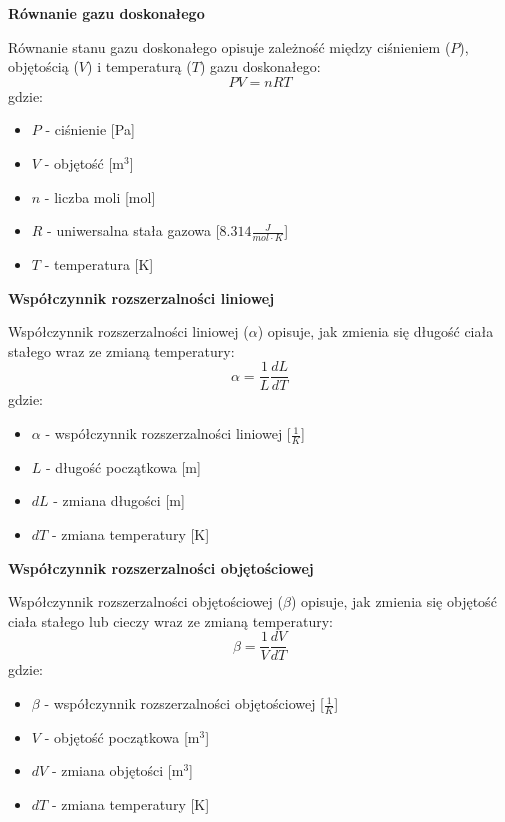 \documentclass{article}
\begin{document}
\textbf{Równanie gazu doskonałego} 

Równanie stanu gazu doskonałego opisuje zależność między ciśnieniem ($P$), objętością ($V$) i temperaturą ($T$) gazu doskonałego:
\begin{equation}
    PV = nRT
\end{equation}
gdzie:
\begin{itemize}
    \item $P$ - ciśnienie [Pa]
    \item $V$ - objętość [m$^3$]
    \item $n$ - liczba moli [mol]
    \item $R$ - uniwersalna stała gazowa [$8.314 \frac{J}{mol \cdot K}$]
    \item $T$ - temperatura [K]
\end{itemize}

\textbf{Współczynnik rozszerzalności liniowej} 

Współczynnik rozszerzalności liniowej ($\alpha$) opisuje, jak zmienia się długość ciała stałego wraz ze zmianą temperatury:
\begin{equation}
    \alpha = \frac{1}{L} \frac{dL}{dT}
\end{equation}
gdzie:
\begin{itemize}
    \item $\alpha$ - współczynnik rozszerzalności liniowej [$\frac{1}{K}$]
    \item $L$ - długość początkowa [m]
    \item $dL$ - zmiana długości [m]
    \item $dT$ - zmiana temperatury [K]
\end{itemize}

\textbf{Współczynnik rozszerzalności objętościowej} 

Współczynnik rozszerzalności objętościowej ($\beta$) opisuje, jak zmienia się objętość ciała stałego lub cieczy wraz ze zmianą temperatury:
\begin{equation}
    \beta = \frac{1}{V} \frac{dV}{dT}
\end{equation}
gdzie:
\begin{itemize}
    \item $\beta$ - współczynnik rozszerzalności objętościowej [$\frac{1}{K}$]
    \item $V$ - objętość początkowa [m$^3$]
    \item $dV$ - zmiana objętości [m$^3$]
    \item $dT$ - zmiana temperatury [K]
\end{itemize}
\end{document}
